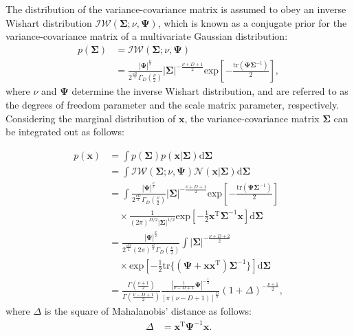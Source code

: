 \documentclass[journal]{IEEEtran}
\begin{document}
The distribution of the variance-covariance matrix is assumed to obey an inverse Wishart distribution ${\mathcal {IW}}(\mathbf{\Sigma}; \nu, \mathbf{\Psi})$, which is known as a conjugate prior for the variance-covariance matrix of a multivariate Gaussian distribution:
%
\begin{align}
	p(\mathbf{\Sigma}) &= {\mathcal {IW}}(\mathbf{\Sigma};\nu,\mathbf{\Psi}) \nonumber\\
&= \frac{|\mathbf{\Psi}|^{\frac{\nu}{2}}}{2^{\frac{\nu D}{2}} \Gamma_D \left(\frac{\nu}{2}\right)} |\mathbf{\Sigma}|^{-\frac{\nu+D+1}{2}} \mathrm{exp} \left[-\frac{\mathrm{tr}(\mathbf{\Psi} \mathbf{\Sigma}^{-1})}{2}\right],\label{eq:p_sigma} %
\end{align}
%
where $\nu$ and $\mathbf{\Psi}$ determine the inverse Wishart distribution, and are referred to as the degrees of freedom parameter and the scale matrix parameter, respectively.
Considering the marginal distribution of $\mathbf{x}$, the variance-covariance matrix $\mathbf{\Sigma}$ can be integrated out as follows:

\begin{align}
	p(\mathbf{x}) &= \int p(\mathbf{\Sigma})p(\mathbf{x}|\mathbf{\Sigma}) \mathrm{d}{\mathbf{\Sigma}} \nonumber \\
		&= \int {\mathcal {IW}}(\mathbf{\Sigma}; \nu, {\mathbf{\Psi}}) {\mathcal N}(\mathbf{x}|\mathbf{\Sigma}) \mathrm{d}{\mathbf{\Sigma}} \label{eq:marginal_x} \\ %
		&= \int \frac{|{\mathbf{\Psi}}|^{\frac{\nu}{2}}}{2^{\frac{\nu D}{2}} \Gamma_D \left(\frac{\nu}{2}\right)} |\mathbf{\Sigma}|^{-\frac{\nu+D+1}{2}}\mathrm{exp} \left[-\frac{\mathrm{tr}(\mathbf{\Psi} \mathbf{\Sigma}^{-1})}{2}\right] \nonumber \\
&\quad \times\frac{1}{(2\pi)^{D/2} |\mathbf{\Sigma}|^{1/2}} \mathrm{exp} \left[-\frac{1}{2}\mathbf{x}^\mathrm{T} {\mathbf{\Sigma}}^{-1} \mathbf{x}\right] \mathrm{d}{\mathbf{\Sigma}} \nonumber \\
		&= \frac{|{\mathbf{\Psi}}|^{\frac{\nu}{2}}}{2^{\frac{\nu D}{2}} (2\pi)^\frac{D}{2} \Gamma_D \left(\frac{\nu}{2}\right)} \int |\mathbf{\Sigma}|^{-\frac{\nu+D+2}{2}}\nonumber\\
&\quad \times \mathrm{exp} \left[-\frac{1}{2}\mathrm{tr}\{(\mathbf{\Psi} + \mathbf{x} \mathbf{x}^\mathrm{T})\mathbf{\Sigma}^{-1}\}\right] \mathrm{d}{\mathbf{\Sigma}} \nonumber \\
\label{eq:p_x}
&= \frac{\Gamma(\frac{\nu+1}{2})}{\Gamma(\frac{\nu-D+1}{2})} \frac{|\frac{1}{\nu-D+1} {\mathbf{\Psi}}|^{-\frac{1}{2}}}{\left[\pi(\nu-D+1) \right]^{\frac{D}{2}}} (1+\Delta)^{-\frac{\nu+1}{2}} ,%
\end{align}
%
where $\Delta$ is the square of Mahalanobis' distance as follows:
%
\begin{align}
	\Delta &= \mathbf{x}^\mathrm{T}{\mathbf{\Psi}}^{-1}\mathbf{x}.
\end{align}
%
\end{document}
